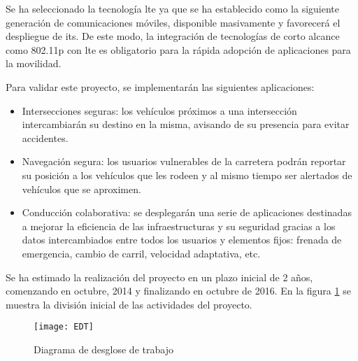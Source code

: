 Se ha seleccionado la tecnología \gls{lte} ya que se ha establecido como la siguiente generación de comunicaciones móviles, disponible masivamente y favorecerá el despliegue de \gls{its}. De este modo, la integración de tecnologías de corto alcance como \Gls{802.11p} con \gls{lte} es obligatorio para la rápida adopción de aplicaciones para la movilidad.

Para validar este proyecto, se implementarán las siguientes aplicaciones:
\begin{itemize}
	\item Intersecciones seguras: los vehículos próximos a una intersección intercambiarán su destino en la misma, avisando de su presencia para evitar accidentes.
	\item Navegación segura: los usuarios vulnerables de la carretera podrán reportar su posición a los vehículos que les rodeen y al mismo tiempo ser alertados de vehículos que se aproximen.
	\item Conducción colaborativa: se desplegarán una serie de aplicaciones destinadas a mejorar la eficiencia de las infraestructuras y su seguridad gracias a los datos intercambiados entre todos los usuarios y elementos fijos: frenada de emergencia, cambio de carril, velocidad adaptativa, etc.
\end{itemize}

Se ha estimado la realización del proyecto en un plazo inicial de 2 años, comenzando en octubre, 2014 y finalizando en octubre de 2016. En la figura \ref{fig:EDT} se muestra la división inicial de las actividades del proyecto.

\begin{figure}[H]
	\begin{center}
		 {
		\texttt{[image: EDT]}
		}
		\caption{Diagrama de desglose de trabajo}
		\label{fig:EDT}
	\end{center}
\end{figure}